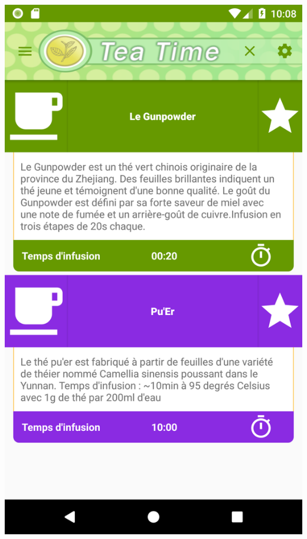 \documentclass[a4paper,12pt]{article}
\begin{document}
\begin{spacing}{1}
	\includegraphics*[scale=0.1]{Screenshot/12.png}    

\end{spacing}
\end{document}
